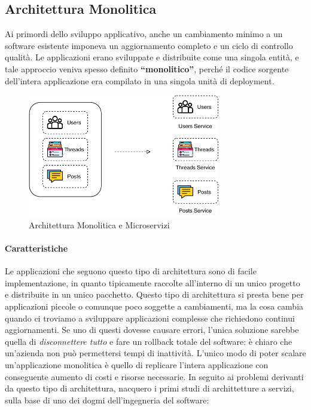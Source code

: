 \subsection{Architettura Monolitica}
Ai primordi dello sviluppo applicativo, anche un cambiamento minimo  a un software esistente imponeva un aggiornamento completo e un ciclo di controllo qualità. Le applicazioni erano sviluppate e distribuite come una singola entità, e tale approccio veniva spesso definito \textbf{“monolitico”}, perché il codice sorgente dell’intera applicazione era compilato in una singola unità di deployment. 

\begin{figure}[H]
    \centering
    \includegraphics[width=0.75\textwidth]{images/01_7_monolithic_vs_microservices.pdf}
    \caption{Architettura Monolitica e Microservizi }
    \label{fig:monolithicvsmicroservices}
\end{figure}

\paragraph{Caratteristiche} Le applicazioni che seguono questo tipo di architettura sono di facile implementazione, in quanto tipicamente raccolte all'interno di un unico progetto e distribuite in un unico pacchetto. Questo tipo di architettura si presta bene per applicazioni piccole o comunque poco soggette a cambiamenti, ma la cosa cambia quando ci troviamo a sviluppare applicazioni complesse che richiedono continui aggiornamenti. Se uno di questi dovesse causare errori, l'unica soluzione sarebbe quella di \textit{disconnettere tutto} e fare un rollback totale del software: è chiaro che un'azienda non può permettersi tempi di inattività. L’unico modo di poter scalare un’applicazione monolitica è quello di replicare l’intera applicazione con conseguente aumento di costi e risorse necessarie. In seguito ai problemi derivanti da questo tipo di architettura, nacquero i primi studi di archittetture a servizi, sulla base di uno dei dogmi dell'ingegneria del software:

